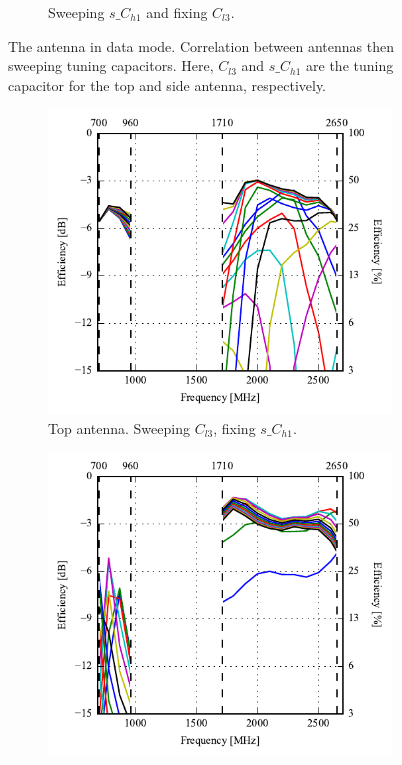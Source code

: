 \begin{figure}[htbp]
\begin{subfigure}{0.49\linewidth}
        \caption{Sweeping $s\_C_{h1}$ and fixing $C_{l3}$.}
    \end{subfigure}
    \caption{The antenna in data mode. Correlation between antennas then sweeping tuning capacitors. Here, $C_{l3}$ and $s\_C_{h1}$ are the tuning capacitor for the top and side antenna, respectively.}
    \label{fig:corr_sol3_data}
\end{figure}

\begin{figure}[htbp]
    \centering
    \begin{subfigure}{0.49\linewidth}
        \centering
        \includegraphics{img/tech_sol/nonresonant/simulation/data_mode/EffSweepAC1/efficiency-ac1-top}
        \caption{Top antenna. Sweeping $C_{l3}$, fixing $s\_C_{h1}$.}
    \end{subfigure}
    \hfill
    \begin{subfigure}{0.49\linewidth}
        \centering
        \includegraphics{img/tech_sol/nonresonant/simulation/data_mode/EffSweepAC2/efficiency-ac2-side}

\end{subfigure}
\end{figure}
